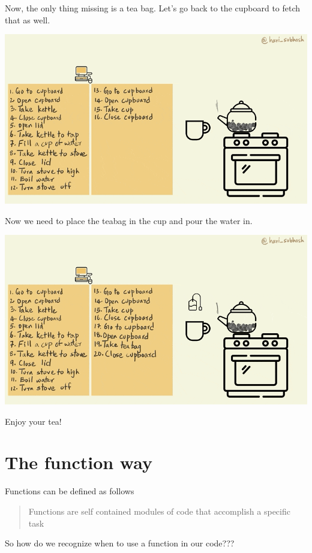 \documentclass[
]{book}
\begin{document}
Now, the only thing missing is a tea bag. Let's go back to the cupboard to fetch that as well.

\includegraphics{assets/ch_3-functions/gifs/get_teabag.gif}

Now we need to place the teabag in the cup and pour the water in.

\includegraphics{assets/ch_3-functions/gifs/pour_water.gif}

Enjoy your tea!

\hypertarget{the-function-way}{%
\section{The function way}\label{the-function-way}}

Functions can be defined as follows \citep{function_def}

\begin{quote}
Functions are self contained modules of code that accomplish a specific task
\end{quote}

So how do we recognize when to use a function in our code???
\end{document}
